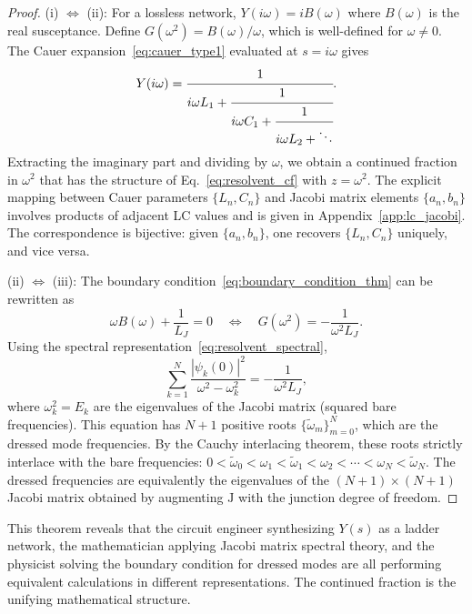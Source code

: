 \documentclass[reprint, floatfix, superscriptaddress, amsmath, amssymb, longbibliography]{revtex4-2}
\begin{document}
\begin{proof}
{(i) $\Leftrightarrow$ (ii):} For a lossless network, $Y(i\omega) = iB(\omega)$ where $B(\omega)$ is the real susceptance. Define $G(\omega^2) = B(\omega)/\omega$, which is well-defined for $\omega \neq 0$. The Cauer expansion~\eqref{eq:cauer_type1} evaluated at $s = i\omega$ gives
\begin{equation}
Y(i\omega) = \cfrac{1}{i\omega L_1 + \cfrac{1}{i\omega C_1 + \cfrac{1}{i\omega L_2 + \ddots}}}.
\end{equation}
Extracting the imaginary part and dividing by $\omega$, we obtain a continued fraction in $\omega^2$ that has the structure of Eq.~\eqref{eq:resolvent_cf} with $z = \omega^2$. The explicit mapping between Cauer parameters $\{L_n, C_n\}$ and Jacobi matrix elements $\{a_n, b_n\}$ involves products of adjacent LC values and is given in Appendix~\ref{app:lc_jacobi}. The correspondence is bijective: given $\{a_n, b_n\}$, one recovers $\{L_n, C_n\}$ uniquely, and vice versa.

{(ii) $\Leftrightarrow$ (iii):} The boundary condition~\eqref{eq:boundary_condition_thm} can be rewritten as
\begin{equation}
\omega B(\omega) + \frac{1}{L_J} = 0 \quad \Longleftrightarrow \quad G(\omega^2) = -\frac{1}{\omega^2 L_J}.
\end{equation}
Using the spectral representation~\eqref{eq:resolvent_spectral},
\begin{equation}
\sum_{k=1}^{N} \frac{|\psi_k(0)|^2}{\omega^2 - \omega_k^2} = -\frac{1}{\omega^2 L_J},
\end{equation}
where $\omega_k^2 = E_k$ are the eigenvalues of the Jacobi matrix (squared bare frequencies). This equation has $N+1$ positive roots $\{\tilde{\omega}_m\}_{m=0}^{N}$, which are the dressed mode frequencies. By the Cauchy interlacing theorem, these roots strictly interlace with the bare frequencies: $0 < \tilde{\omega}_0 < \omega_1 < \tilde{\omega}_1 < \omega_2 < \cdots < \omega_N < \tilde{\omega}_N$. The dressed frequencies are equivalently the eigenvalues of the $(N+1) \times (N+1)$ Jacobi matrix obtained by augmenting $\mathrm{J}$ with the junction degree of freedom.
\end{proof}

This theorem reveals that the circuit engineer synthesizing $Y(s)$ as a ladder network, the mathematician applying Jacobi matrix spectral theory, and the physicist solving the boundary condition for dressed modes are all performing equivalent calculations in different representations. The continued fraction is the unifying mathematical structure.
\end{document}
